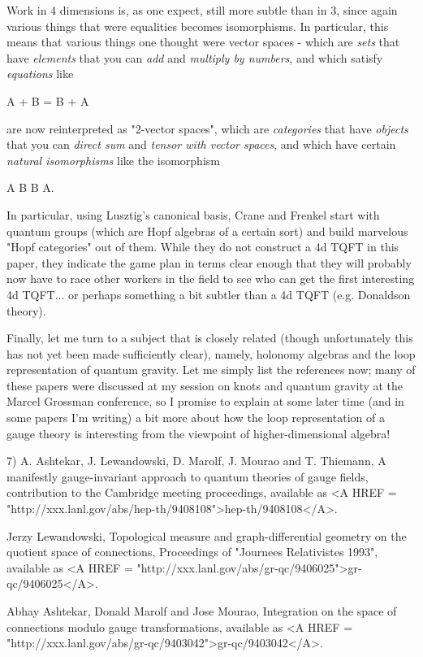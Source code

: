 Work in 4 dimensions is, as one expect, still more subtle than in 3,
since again various things that were equalities becomes isomorphisms.
In particular, this means that various things one thought were vector
spaces - which are \emph{sets} 
that have \emph{elements} that you can \emph{add} and
\emph{multiply by numbers}, and which satisfy \emph{equations} 
like 

A + B = B + A

are now reinterpreted as "2-vector spaces", which are \emph{categories} that have \emph{objects} that you can \emph{direct sum} and \emph{tensor with vector spaces}, and which have certain \emph{natural isomorphisms} like the isomorphism 

A \oplus  B \cong  B \oplus  A.  

In particular, using
Lusztig's canonical basis, Crane and Frenkel start with quantum groups
(which are Hopf algebras of a certain sort) and build marvelous "Hopf
categories" out of them.  While they do not construct a 4d TQFT in this
paper, they indicate the game plan in terms clear enough that they will
probably now have to race other workers in the field to see who can get
the first interesting 4d TQFT... or perhaps something a bit subtler than
a 4d TQFT (e.g. Donaldson theory).

Finally, let me turn to a subject that is closely related (though
unfortunately this has not yet been made sufficiently clear), namely,
holonomy algebras and the loop representation of quantum gravity.  Let
me simply list the references now; many of these papers were discussed
at my session on knots and quantum gravity at the Marcel Grossman
conference, so I promise to explain at some later time (and in some
papers I'm writing) a bit more about how the loop representation of a
gauge theory is interesting from the viewpoint of higher-dimensional
algebra!

7)  
A. Ashtekar, J. Lewandowski, D. Marolf, J. Mourao and T. Thiemann,
A manifestly gauge-invariant approach to quantum theories of gauge
fields, 
contribution to the Cambridge meeting proceedings, 
available as 
<A HREF = "http://xxx.lanl.gov/abs/hep-th/9408108">hep-th/9408108</A>.  

Jerzy Lewandowski, 
Topological measure and graph-differential geometry on the quotient
space of connections, Proceedings of
"Journees Relativistes 1993", 
available as 
<A HREF = "http://xxx.lanl.gov/abs/gr-qc/9406025">gr-qc/9406025</A>.  

Abhay Ashtekar, Donald Marolf and Jose Mourao, 
Integration on the space of connections modulo gauge transformations,
available
as <A HREF = "http://xxx.lanl.gov/abs/gr-qc/9403042">gr-qc/9403042</A>. 

